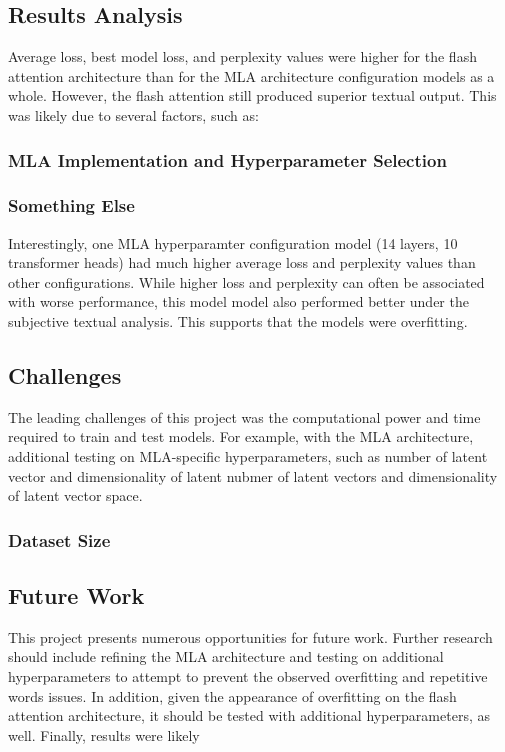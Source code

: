 
\subsection{Results Analysis}
Average loss, best model loss, and perplexity values were higher for the flash attention architecture than for the MLA architecture configuration models as a whole. However, the 
flash attention still produced superior textual output.   
This was likely due to several factors, such as:
\subsubsection{MLA Implementation and Hyperparameter Selection}



\subsubsection{Something Else}


Interestingly, one MLA hyperparamter configuration model (14 layers, 10 transformer heads) had much higher average loss and perplexity values than other configurations. 
While higher loss and perplexity can often be associated with worse performance, this model model also performed better under the subjective textual analysis.  
This supports that the models were overfitting.

\subsection{Challenges}
The leading challenges of this project was the computational power and time required to train and test models. 
For example, with the MLA architecture, additional testing on MLA-specific hyperparameters, such as number of latent vector and dimensionality of latent 
nubmer of latent vectors and dimensionality of latent vector space.  


\subsubsection{Dataset Size}


\subsection{Future Work}
This project presents numerous opportunities for future work. 
Further research should include refining the MLA architecture and testing on additional hyperparameters to attempt to prevent the observed overfitting and repetitive words issues.
In addition, given the appearance of overfitting on the flash attention architecture, it should be tested with additional hyperparameters, as well.
Finally, results were likely 